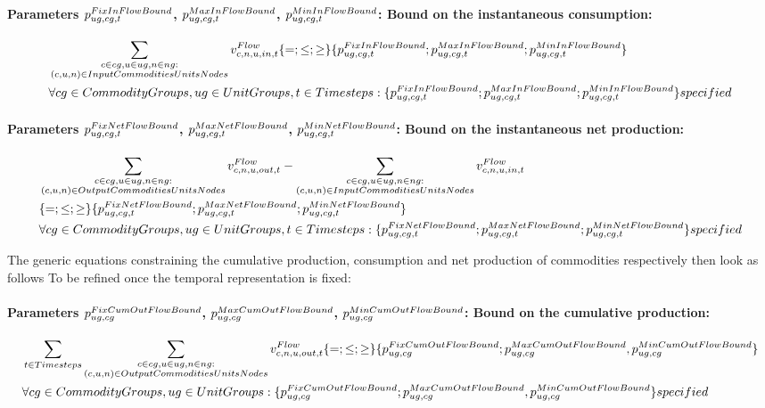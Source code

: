 \paragraph{Parameters $\pFixInFlowBound$, $\pMaxInFlowBound$, $\pMinInFlowBound$: Bound on the instantaneous consumption:}
\begin{align} \label{eq:inflowbound}
&\sum_{\substack{\commodity \in \commoditygroup, \unit \in \unitgroup, \node \in \nodegroup: \\ \InputCommoditiesUnitsNodes}} \vFlow[\commodity,\node,\unit,in,\timestep]  \{=;\le;\ge\} \{\pFixInFlowBound ; \pMaxInFlowBound ; \pMinInFlowBound\} \nonumber \\
&\forall \commoditygroups, \unitgroups, \timesteps : \{\pFixInFlowBound ; \pMaxInFlowBound ; \pMinInFlowBound\} specified
\end{align}

\paragraph{Parameters $\pFixNetFlowBound$, $\pMaxNetFlowBound$, $\pMinNetFlowBound$: Bound on the instantaneous net production:}
\begin{align} \label{eq:netflowbound}
&\sum_{\substack{\commodity \in \commoditygroup, \unit \in \unitgroup, \node \in \nodegroup: \\ \OutputCommoditiesUnitsNodes}} \vFlow[\commodity,\node,\unit,out,\timestep] - \sum_{\substack{\commodity \in \commoditygroup, \unit \in \unitgroup, \node \in \nodegroup: \\ \InputCommoditiesUnitsNodes}} \vFlow[\commodity,\node,\unit,in,\timestep]  \nonumber \\
&\{=;\le;\ge\} \{\pFixNetFlowBound;\pMaxNetFlowBound;\pMinNetFlowBound\} \nonumber \\
&\forall \commoditygroups, \unitgroups, \timesteps : \{\pFixNetFlowBound;\pMaxNetFlowBound;\pMinNetFlowBound \} specified
\end{align}

 The generic equations constraining the cumulative production, consumption and net production of commodities respectively then look as follows {\color{red} To be refined once the temporal representation is fixed}: 

\paragraph{Parameters $\pFixCumOutFlowBound$, $\pMaxCumOutFlowBound$, $\pMinCumOutFlowBound$: Bound on the cumulative production:}
\begin{align} \label{eq:cumoutflowbound}
&\sum_{\timesteps} \sum_{\substack{\commodity \in \commoditygroup, \unit \in \unitgroup, \node \in \nodegroup: \\ \OutputCommoditiesUnitsNodes}} \vFlow[\commodity,\node,\unit,out,\timestep]  \{=;\le;\ge\} \{\pFixCumOutFlowBound ; \pMaxCumOutFlowBound , \pMinCumOutFlowBound \} \nonumber \\
&\forall \commoditygroups, \unitgroups: \{\pFixCumOutFlowBound ; \pMaxCumOutFlowBound , \pMinCumOutFlowBound \} specified
\end{align}

